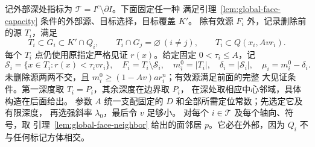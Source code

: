 记外部深处指标为 \(\mathcal T=I^c\setminus\partial I\)。下面固定任一种
满足引理~\ref{lem:global-face-capacity} 条件的外部源、目标选择，目标覆盖 \(K'\)。
除有效源 \(F_i\) 外，记录删除前的源 \(T_i\)，满足
\begin{equation}\label{eq:global-pre-source}
 T_i\subset G_i\subset K'\cap Q_i,\qquad
 T_i\cap G_j=\varnothing\ (i\ne j),\qquad
 T_i\subset Q(x_i,Avr_i).
\end{equation}
每个 \(T_i\) 点仍使用原指定严格见证 \(r(x)\)。给定固定
\(0<\tau_i\le A\)，记
\begin{equation}\label{eq:global-small-source-definition}
 \mathcal S_i=\{x\in T_i:r(x)<\tau_i vr_i\},\quad
 F_i=T_i\setminus\mathcal S_i,\quad
 m_i^0=|T_i|,\quad\delta_i=|\mathcal S_i|,\quad\mu_i=m_i^0-\delta_i.
\end{equation}
未删除源两两不交，且 \(m_i^0\ge(1-Av)ar_i^n\)；有效源满足前面的完整
大见证条件。第一深度取 \(T_i=P_i\)，其余深度在边界取 \(P_i\)，
在深处取相应中心邻域，具体构造在后面给出。
参数 \(A\) 统一支配固定的 \(D\) 和全部所需定位常数；先选定它及有限深度，
再选强斜率 \(\lambda_0\)，最后令 \(v\) 足够小。
对每个 \(i\in\mathcal T\) 及每个轴向、符号，取
引理~\ref{lem:global-face-neighbor} 给出的面邻居 \(p\)。它必在外部，因为
\(Q_i\) 不与任何标记方体相交。

